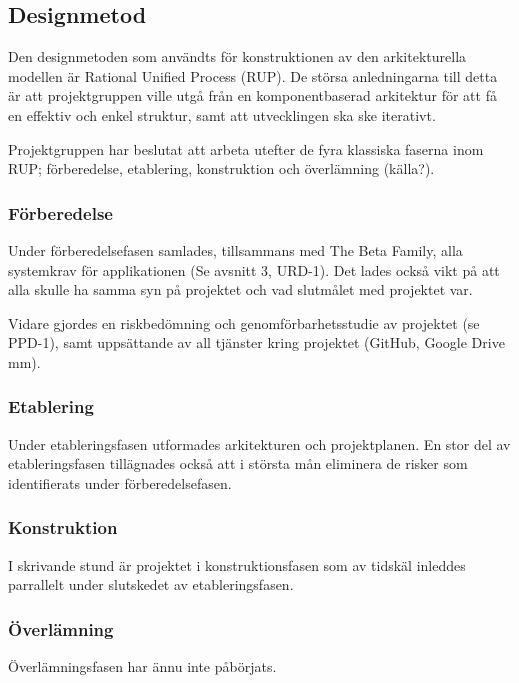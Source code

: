 \subsection{Designmetod}
Den designmetoden som användts för konstruktionen av den arkitekturella modellen är Rational Unified Process (RUP). De störsa anledningarna till detta är att projektgruppen ville utgå från en komponentbaserad arkitektur för att få en effektiv och enkel struktur, samt att utvecklingen ska ske iterativt.

Projektgruppen har beslutat att arbeta utefter de fyra klassiska faserna inom RUP; förberedelse, etablering, konstruktion och överlämning (källa?). 

\subsubsection{Förberedelse}
Under förberedelsefasen samlades, tillsammans med The Beta Family, alla systemkrav för applikationen (Se avsnitt 3, URD-1). Det lades också vikt på att alla skulle ha samma syn på projektet och vad slutmålet med projektet var.

Vidare gjordes en riskbedömning och genomförbarhetsstudie av projektet (se PPD-1), samt uppsättande av all tjänster kring projektet (GitHub, Google Drive mm).

\subsubsection{Etablering}
Under etableringsfasen utformades arkitekturen och projektplanen. En stor del av etableringsfasen tillägnades också att i största mån eliminera de risker som identifierats under förberedelsefasen.

\subsubsection{Konstruktion}
I skrivande stund är projektet i konstruktionsfasen som av tidskäl inleddes parrallelt under slutskedet av etableringsfasen.

\subsubsection{Överlämning}
Överlämningsfasen har ännu inte påbörjats.
